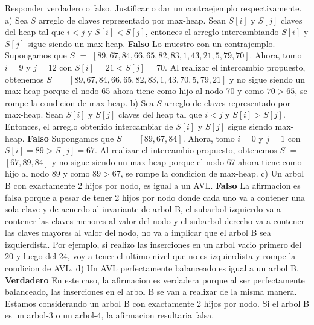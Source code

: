 \documentclass[10pt,a4paper]{article}
\begin{document}
Responder verdadero o falso. Justificar o dar un contraejemplo respectivamente.
\newline
\newline
a) Sea $S$ arreglo de claves representado por max-heap. Sean $S[i]$ y $S[j]$ claves del heap tal que $i < j$ y $S[i] < S[j]$, entonces el arreglo intercambiando $S[i]$ y $S[j]$ sigue siendo un max-heap. \textbf{Falso}
\newline
\newline
Lo muestro con un contrajemplo.
\newline
\newline
Supongamos que $S$ $=$ $[89,67,84,66,65,82,83,1,43,21,5,79,70]$. Ahora, tomo $i = 9$ y $j = 12$ con $S[i] = 21 < S[j] = 70$.
\newline
\newline
Al realizar el intercambio propuesto, obtenemos $S$ $=$ $[89,67,84,66,65,82,83,1,43,70,5,79,21]$ y no sigue siendo un max-heap porque el nodo 65 ahora tiene como hijo al nodo 70 y como $70 > 65$, se rompe la condicion de max-heap.  
\newline
\newline
b) Sea $S$ arreglo de claves representado por max-heap. Sean $S[i]$ y $S[j]$ claves del heap tal que $i < j$ y $S[i] > S[j]$. Entonces, el arreglo obtenido intercambiar de $S[i]$ y $S[j]$ sigue siendo max-heap. \textbf{Falso}
\newline
\newline
Supongamos que $S$ $=$ $[89,67,84]$. Ahora, tomo $i = 0$ y $j = 1$ con $S[i] = 89 > S[j] = 67$.
\newline
\newline
Al realizar el intercambio propuesto, obtenemos $S$ $=$ $[67,89,84]$ y no sigue siendo un max-heap porque el nodo 67 ahora tiene como hijo al nodo 89 y como $89 > 67$, se rompe la condicion de max-heap.  
\newline
\newline
c) Un arbol B con exactamente 2 hijos por nodo, es igual a un AVL. \textbf{Falso}
\newline
\newline
La afirmacion es falsa porque a pesar de tener 2 hijos por nodo donde cada uno va a contener una sola clave y de acuerdo al invariante de arbol B, el subarbol izquierdo va a contener las claves menores al valor del nodo y el subarbol derecho va a contener las claves mayores al valor del nodo, no va a implicar que el arbol B sea izquierdista. Por ejemplo, si realizo las inserciones en un arbol vacio primero del 20 y luego del 24, voy a tener el ultimo nivel que no es izquierdista y rompe la condicion de AVL.   
\newline
\newline
d) Un AVL perfectamente balanceado es igual a un arbol B. \textbf{Verdadero}
\newline
\newline
En este caso, la afirmacion es verdadera porque al ser perfectamente balanceado, las inserciones en el arbol B se van a realizar de la misma manera. Estamos considerando un arbol B con exactamente 2 hijos por nodo. Si el arbol B es un arbol-3 o un arbol-4, la afirmacion resultaria falsa.
\newpage
\end{document}
